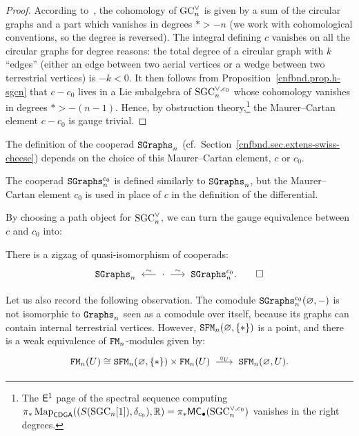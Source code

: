 \begin{proof}
  According to~\cite[Proposition~2.2.3]{FresseWillwacher2015}, the cohomology of $\mathrm{GC}_{n}^{\vee}$ is given by a sum of the circular graphs and a part which vanishes in degrees $* > -n$ (we work with cohomological conventions, so the degree is reversed).
  The integral defining $c$ vanishes on all the circular graphs for degree reasons: the total degree of a circular graph with $k$ ``edges'' (either an edge between two aerial vertices or a wedge between two terrestrial vertices) is $-k < 0$.
  It then follows from Proposition~\ref{cnfbnd.prop.h-sgcn} that $c - c_{0}$ lives in a Lie subalgebra of $\mathrm{SGC}_{n}^{\vee, c_{0}}$ whose cohomology vanishes in degrees $* > -(n - 1)$.
  Hence, by obstruction theory,\footnote{The $\mathsf{E}^{1}$ page of the spectral sequence computing $\pi_{*} \operatorname{Map}_{\mathsf{CDGA}}((S(\mathrm{SGC}_{n}[1]), \delta_{c_{0}}), \mathbb{R}) = \pi_{*} \mathsf{MC}_{\bullet}(\mathrm{SGC}_{n}^{\vee,c_{0}})$ vanishes in the right degrees.} the Maurer--Cartan element $c - c_{0}$ is gauge trivial.
\end{proof}

The definition of the cooperad $\mathtt{SGraphs}_{n}$ (cf.\ Section~\ref{cnfbnd.sec.extens-swiss-cheese}) depends on the choice of this Maurer--Cartan element, $c$ or $c_{0}$.

\begin{definition}
  \label{cnfbnd.def.sgraphs0}
  The cooperad $\mathtt{SGraphs}_{n}^{c_{0}}$ is defined similarly to $\mathtt{SGraphs}_{n}$, but the Maurer--Cartan element $c_{0}$ is used in place of $c$ in the definition of the differential.
\end{definition}

By choosing a path object for $\mathrm{SGC}_{n}^{\vee}$, we can turn the gauge equivalence between $c$ and $c_{0}$ into:
\begin{corollary}
  \label{cnfbnd.cor.sgraphs-c0}
  There is a zigzag of quasi-isomorphism of cooperads:
  \begin{equation*}
    \SGraphs_{n} \qiso* \cdot \qiso \SGraphs_{n}^{c_{0}}. 
    \qed
  \end{equation*}
\end{corollary}

Let us also record the following observation.
The comodule $\mathtt{SGraphs}_{n}^{c_{0}}(\varnothing, -)$ is not isomorphic to $\mathtt{Graphs}_{n}$ seen as a comodule over itself, because its graphs can contain internal terrestrial vertices.
However, $\mathtt{SFM}_{n}(\varnothing, \{*\})$ is a point, and there is a weak equivalence of $\mathtt{FM}_{n}$-modules given by:
\begin{equation}
  \FM_{n}(U) \cong \SFM_{n}(\varnothing, \{*\}) \times \FM_{n}(U) \tkrightarrow{\circ_{U}} \SFM_{n}(\varnothing, U).
\end{equation}

